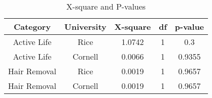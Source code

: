 \documentclass[10pt,a4paper]{article}
\begin{document}
%
%
%
%
%
%
%
%
%
%
%
%
%
\begin{table}[H]
\begin{tabular}{c|c|c|c|c}
\centering

Category	&University	&X-square 	&df	&p-value\\
\hline
\hfill Active Life	&Rice	&1.0742	&1	&0.3\\
\hfill Active Life	&Cornell	&0.0066	&1	&0.9355\\
\hfill Hair Removal	&Rice	&0.0019	&1	&0.9657\\
\hfill Hair Removal	&Cornell	&0.0019	&1	&0.9657\\


\end{tabular}
\caption{X-square and P-values}
\end{table}
\end{document}
